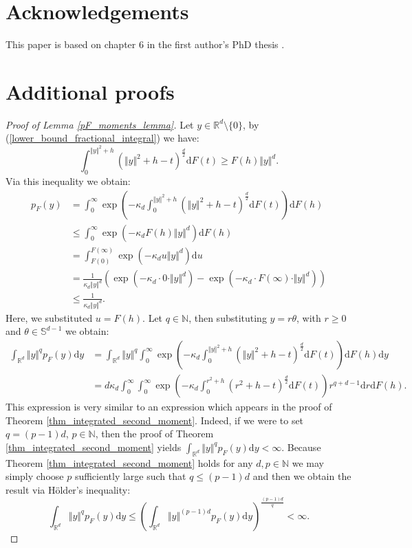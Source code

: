 \documentclass{article}
\newcommand{\NN}{\mathbb{N}}
\newcommand{\RR}{\mathbb{R}}
\newcommand{\Sp}{\mathbb{S}}
\theoremstyle{plain}
\theoremstyle{remark}
\theoremstyle{definition}
\begin{document}
\section{Acknowledgements}
This paper is based on chapter 6 in the first author's PhD thesis \cite{vdjagt2026}.

\section{Additional proofs}\label{section_proofs_inversion}

\begin{proof}[Proof of Lemma \ref{pF_moments_lemma}]
Let $y \in \RR^d \setminus \{0\}$, by (\ref{lower_bound_fractional_integral}) we have:
\[ \int_0^{\Vert y \Vert^2 + h}\left(\Vert y \Vert^2 + h -t \right)^\frac{d}{2}\mathrm{d}F(t) \geq F(h) \Vert y \Vert^d.\]
Via this inequality we obtain:
\begin{align*}
    p_F(y) &= \int_0^\infty \exp\left(-\kappa_d \int_0^{\Vert y \Vert^2 +h}\left(\Vert y \Vert^2 +h -t \right)^{\frac{d}{2}}\mathrm{d}F(t) \right)\mathrm{d}F(h) \\
    &\leq \int_0^\infty \exp\left(-\kappa_d F(h) \Vert y \Vert^d \right)\mathrm{d}F(h)\\
   &= \int_{F(0)}^{F(\infty)} \exp\left(-\kappa_d u \Vert y \Vert^d \right)\mathrm{d}u \\
   &= \frac{1}{\kappa_d \Vert y \Vert^d}\left(\exp\left(-\kappa_d \cdot 0 \cdot \Vert y \Vert^d \right) - \exp\left(-\kappa_d \cdot F(\infty) \cdot \Vert y \Vert^d \right) \right) \\
   &\leq \frac{1}{\kappa_d \Vert y \Vert^d}.
\end{align*}
Here, we substituted $u = F(h)$. Let $q \in \NN$, then substituting $y = r\theta$, with $r \geq 0$ and $\theta \in \Sp^{d-1}$ we obtain:
{\allowdisplaybreaks
\begin{align*}
        \int_{\RR^d}\Vert y \Vert^qp_F(y)\mathrm{d}y &= \int_{\RR^d}\Vert y \Vert^q\int_0^\infty \exp\left(-\kappa_d \int_0^{\Vert y \Vert^2 +h}\left(\Vert y \Vert^2 +h -t \right)^{\frac{d}{2}}\mathrm{d}F(t) \right)\mathrm{d}F(h)\mathrm{d}y\\
        &= d \kappa_d  \int_0^\infty  \int_0^\infty \exp\left(-\kappa_d \int_0^{r^2 +h}\left(r^2 + h - t \right)^{\frac{d}{2}}\mathrm{d}F(t) \right)r^{q+d-1} \mathrm{d}r\mathrm{d}F(h).
    \end{align*}
}%
    This expression is very similar to an expression which appears in the proof of Theorem \ref{thm_integrated_second_moment}. Indeed, if we were to set $q = (p-1)d$, $p \in \NN$, then the proof of Theorem \ref{thm_integrated_second_moment} yields $\int_{\RR^d}\Vert y \Vert^qp_F(y)\mathrm{d}y < \infty$. Because Theorem \ref{thm_integrated_second_moment} holds for any $d, p \in \NN$ we may simply choose $p$ sufficiently large such that $q \leq (p-1)d$ and then we obtain the result via H\"older's inequality:
    \[\int_{\RR^d}\Vert y \Vert^qp_F(y)\mathrm{d}y \leq \left(\int_{\RR^d}\Vert y \Vert^{(p-1)d}p_F(y)\mathrm{d}y\right)^\frac{(p-1)d}{q} < \infty.\]
\end{proof}
\end{document}
